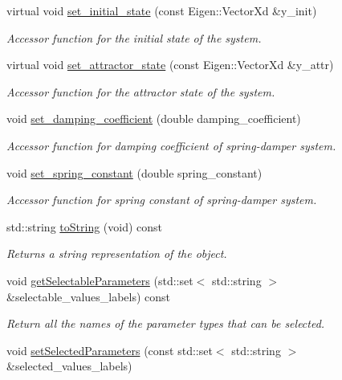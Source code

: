 \begin{DoxyCompactItemize}
virtual void \hyperlink{classDmpBbo_1_1Dmp_ad4e11c676c2add8a992db1caf542f0a0}{set\+\_\+initial\+\_\+state} (const Eigen\+::\+Vector\+Xd \&y\+\_\+init)
\begin{DoxyCompactList}\small\item\em Accessor function for the initial state of the system. \end{DoxyCompactList}\item 
virtual void \hyperlink{classDmpBbo_1_1Dmp_a6dccbd077acfd148f528a48a72a4003f}{set\+\_\+attractor\+\_\+state} (const Eigen\+::\+Vector\+Xd \&y\+\_\+attr)
\begin{DoxyCompactList}\small\item\em Accessor function for the attractor state of the system. \end{DoxyCompactList}\item 
void \hyperlink{classDmpBbo_1_1Dmp_a0b6f58851f4a8fc8b433936cff4c3e7e}{set\+\_\+damping\+\_\+coefficient} (double damping\+\_\+coefficient)
\begin{DoxyCompactList}\small\item\em Accessor function for damping coefficient of spring-\/damper system. \end{DoxyCompactList}\item 
void \hyperlink{classDmpBbo_1_1Dmp_a8844968245473d1fedd2a2b632fb074a}{set\+\_\+spring\+\_\+constant} (double spring\+\_\+constant)
\begin{DoxyCompactList}\small\item\em Accessor function for spring constant of spring-\/damper system. \end{DoxyCompactList}\item 
std\+::string \hyperlink{classDmpBbo_1_1Dmp_a1aca816b42cf0d36118be0ab91120d77}{to\+String} (void) const 
\begin{DoxyCompactList}\small\item\em Returns a string representation of the object. \end{DoxyCompactList}\item 
void \hyperlink{classDmpBbo_1_1Dmp_adaae949509cd3b2e6ce58deb841c80a0}{get\+Selectable\+Parameters} (std\+::set$<$ std\+::string $>$ \&selectable\+\_\+values\+\_\+labels) const 
\begin{DoxyCompactList}\small\item\em Return all the names of the parameter types that can be selected. \end{DoxyCompactList}\item 
void \hyperlink{classDmpBbo_1_1Dmp_a8a976b5db2d1809ece10e431816f0f27}{set\+Selected\+Parameters} (const std\+::set$<$ std\+::string $>$ \&selected\+\_\+values\+\_\+labels)

\end{DoxyCompactItemize}
